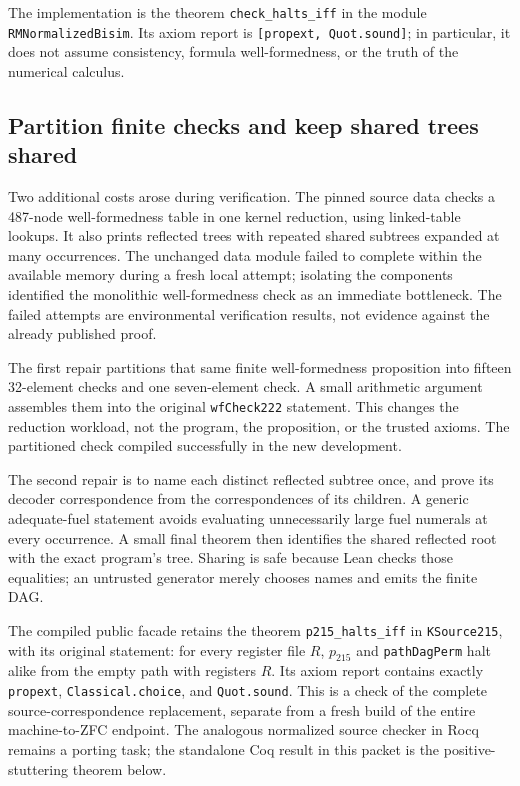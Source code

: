 \documentclass[11pt,letterpaper]{article}
\theoremstyle{definition}\newtheorem{definition}[theorem]{Definition}
\theoremstyle{remark}\newtheorem{remark}[theorem]{Remark}
\begin{document}
The implementation is the theorem \texttt{check\_halts\_iff} in the module
\texttt{RMNormalizedBisim}. Its axiom report is
\texttt{[propext, Quot.sound]}; in particular, it does not assume consistency,
formula well-formedness, or the truth of the numerical calculus.

\subsection{Partition finite checks and keep shared trees shared}

Two additional costs arose during verification. The pinned source data
checks a 487-node well-formedness table in one kernel reduction, using
linked-table lookups. It also prints reflected trees with repeated shared
subtrees expanded at many occurrences. The unchanged data module failed
to complete within the available memory during a fresh local attempt;
isolating the components identified the monolithic well-formedness check
as an immediate bottleneck. The failed attempts are environmental
verification results, not evidence against the already published proof.

The first repair partitions that same finite well-formedness proposition
into fifteen 32-element checks and one seven-element check. A small
arithmetic argument assembles them into the original
\texttt{wfCheck222} statement. This changes the reduction workload, not the
program, the proposition, or the trusted axioms. The partitioned check
compiled successfully in the new development.

The second repair is to name each distinct reflected subtree once, and
prove its decoder correspondence from the correspondences of its children.
A generic adequate-fuel statement avoids evaluating unnecessarily large
fuel numerals at every occurrence. A small final theorem then identifies
the shared reflected root with the exact program's tree. Sharing is safe
because Lean checks those equalities; an untrusted generator merely chooses
names and emits the finite DAG.

\TreeStatus

The compiled public facade retains the theorem \texttt{p215\_halts\_iff}
in \texttt{KSource215}, with its original statement: for every register
file $R$, $p_{215}$ and \texttt{pathDagPerm} halt alike from the empty
path with registers $R$. Its axiom report contains exactly
\texttt{propext}, \texttt{Classical.choice}, and \texttt{Quot.sound}.
This is a check of the complete source-correspondence replacement, separate
from a fresh build of the entire machine-to-ZFC endpoint. The analogous
normalized source checker in Rocq remains a porting task; the standalone
Coq result in this packet is the positive-stuttering theorem below.
\end{document}
